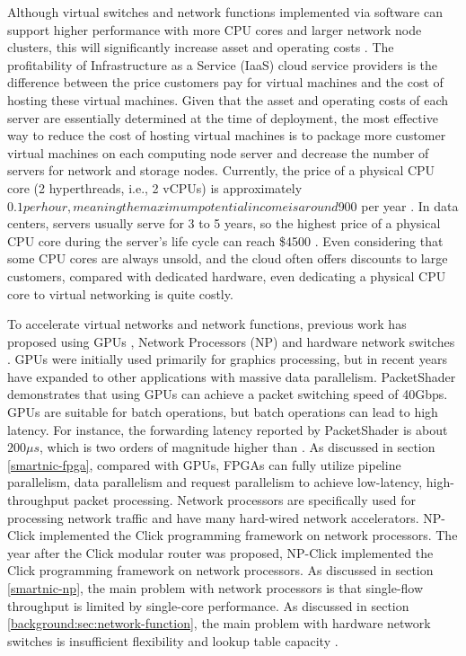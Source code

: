 Although virtual switches and network functions implemented via software can support higher performance with more CPU cores and larger network node clusters, this will significantly increase asset and operating costs \cite {ananta,duet}.
The profitability of Infrastructure as a Service (IaaS) cloud service providers is the difference between the price customers pay for virtual machines and the cost of hosting these virtual machines.
Given that the asset and operating costs of each server are essentially determined at the time of deployment, the most effective way to reduce the cost of hosting virtual machines is to package more customer virtual machines on each computing node server and decrease the number of servers for network and storage nodes.
Currently, the price of a physical CPU core (2 hyperthreads, i.e., 2 vCPUs) is approximately $0.1 per hour, meaning the maximum potential income is around $900 per year \cite{smartnic}.
In data centers, servers usually serve for 3 to 5 years, so the highest price of a physical CPU core during the server's life cycle can reach \$4500 \cite{smartnic}.
Even considering that some CPU cores are always unsold, and the cloud often offers discounts to large customers, compared with dedicated hardware, even dedicating a physical CPU core to virtual networking is quite costly.

To accelerate virtual networks and network functions, previous work has proposed using GPUs \cite {packetshader}, Network Processors (NP) \cite {cavium,netronome} and hardware network switches \cite {duet}.
GPUs were initially used primarily for graphics processing, but in recent years have expanded to other applications with massive data parallelism.
PacketShader \cite {packetshader} demonstrates that using GPUs can achieve a packet switching speed of 40Gbps.
GPUs are suitable for batch operations, but batch operations can lead to high latency.
For instance, the forwarding latency reported by PacketShader \cite {packetshader} is about $200 \mu{}s$, which is two orders of magnitude higher than \name{}.
As discussed in section \ref{smartnic-fpga}, compared with GPUs, FPGAs can fully utilize pipeline parallelism, data parallelism and request parallelism to achieve low-latency, high-throughput packet processing.
Network processors are specifically used for processing network traffic and have many hard-wired network accelerators.
NP-Click \cite{shah2004np} implemented the Click programming framework on network processors.
The year after the Click modular router \cite{kohler2000click} was proposed, NP-Click \cite{shah2004np} implemented the Click programming framework on network processors.
As discussed in section \ref{smartnic-np}, the main problem with network processors is that single-flow throughput is limited by single-core performance.
As discussed in section \ref{background:sec:network-function}, the main problem with hardware network switches is insufficient flexibility and lookup table capacity \cite {duet}.

